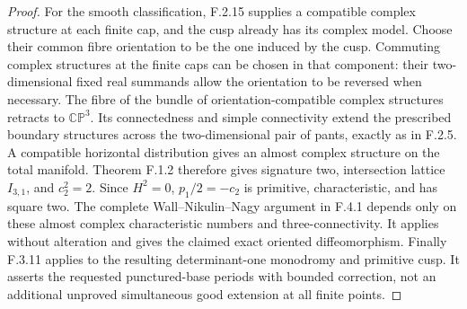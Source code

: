 \begin{proof}
For the smooth classification, F.2.15 supplies a
compatible complex structure at each finite cap, and
the cusp already has its complex model.
Choose their common fibre orientation to be the one
induced by the cusp.
Commuting complex structures at the finite caps can
be chosen in that component: their two-dimensional
fixed real summands allow the orientation to be
reversed when necessary.
The fibre of the bundle of orientation-compatible
complex structures retracts to $\mathbb{CP}^3$.
Its connectedness and simple connectivity extend
the prescribed boundary structures across the
two-dimensional pair of pants, exactly as in F.2.5.
A compatible horizontal distribution gives an
almost complex structure on the total manifold.
Theorem F.1.2 therefore gives signature two,
intersection lattice $I_{3,1}$, and $c_2^2=2$.
Since $H^2=0$, $p_1/2=-c_2$ is primitive,
characteristic, and has square two.
The complete Wall--Nikulin--Nagy argument in F.4.1
depends only on these almost complex characteristic
numbers and three-connectivity.
It applies without alteration and gives the claimed
exact oriented diffeomorphism.
Finally F.3.11 applies to the resulting determinant-one
monodromy and primitive cusp.
It asserts the requested punctured-base periods with
bounded correction, not an additional unproved
simultaneous good extension at all finite points.
\end{proof}
